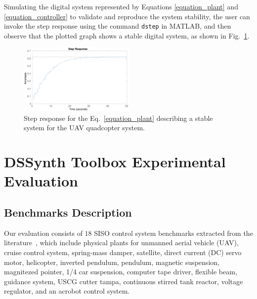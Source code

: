 \documentclass[10pt,conference]{IEEEtran}
\newcommand\tool{{DSSynth Toolbox}\xspace}
\begin{document}
Simulating the digital system represented by Equations
\eqref{equation_plant} and \eqref{equation_controller} to validate and
reproduce the system stability, the user can invoke the step response using
the command \texttt{dstep} in MATLAB, and then observe that the plotted
graph shows a stable digital system, as shown in Fig.~\ref{step-response}.
%
\begin{figure}[ht]
  \includegraphics[width=0.5\textwidth]{step-response.eps}
  \caption{Step response for the Eq.~\eqref{equation_plant} describing a stable system for the UAV quadcopter system.}
  \label{step-response}
\end{figure}

\section{\tool Experimental Evaluation}

\subsection{Benchmarks Description}
\label{benchmarks-description}

Our evaluation consists of $18$ SISO control system benchmarks extracted
from the literature~\cite{abate2017,abatecav2017,bouabdallah,
acrobot,cstr,KOKOTOVIC198023,gajic2008optimal,Franklin15, maglev,
converters,
CTMS,DBLP:journals/tc/BessaIPCF17,DBLP:journals/dafes/BessaICF16}, which
include physical plants for unmanned aerial vehicle (UAV), cruise control
system, spring-mass damper, satellite, direct current (DC) servo motor,
helicopter, inverted pendulum, pendulum, magnetic suspension, magnitezed
pointer, 1/4 car suspension, computer tape driver, flexible beam, guidance
system, USCG cutter tampa, continuous stirred tank reactor, voltage
regulator, and an acrobot control system.
\end{document}

